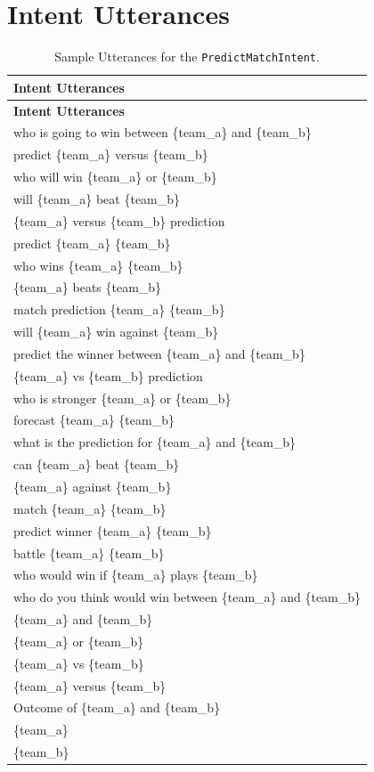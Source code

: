 \chapter{Intent Utterances}
{
\renewcommand{\arraystretch}{1.3}
\begin{longtable}{@{} p{\linewidth} @{}}
\caption{Sample Utterances for the \texttt{PredictMatchIntent}.} \label{tab:utterances} \\
\toprule
\textbf{Intent Utterances} \\
\midrule
\endfirsthead

\toprule
\textbf{Intent Utterances} \\
\midrule
\endhead

\bottomrule
\endfoot

who is going to win between \{team\_a\} and \{team\_b\} \\
predict \{team\_a\} versus \{team\_b\} \\
who will win \{team\_a\} or \{team\_b\} \\
will \{team\_a\} beat \{team\_b\} \\
\{team\_a\} versus \{team\_b\} prediction \\
predict \{team\_a\} \{team\_b\} \\
who wins \{team\_a\} \{team\_b\} \\
\{team\_a\} beats \{team\_b\} \\
match prediction \{team\_a\} \{team\_b\} \\
will \{team\_a\} win against \{team\_b\} \\
predict the winner between \{team\_a\} and \{team\_b\} \\
\{team\_a\} vs \{team\_b\} prediction \\
who is stronger \{team\_a\} or \{team\_b\} \\
forecast \{team\_a\} \{team\_b\} \\
what is the prediction for \{team\_a\} and \{team\_b\} \\
can \{team\_a\} beat \{team\_b\} \\
\{team\_a\} against \{team\_b\} \\
match \{team\_a\} \{team\_b\} \\
predict winner \{team\_a\} \{team\_b\} \\
battle \{team\_a\} \{team\_b\} \\
who would win if \{team\_a\} plays \{team\_b\} \\
who do you think would win between \{team\_a\} and \{team\_b\} \\
\{team\_a\} and \{team\_b\} \\
\{team\_a\} or \{team\_b\} \\
\{team\_a\} vs \{team\_b\} \\
\{team\_a\} versus \{team\_b\} \\
Outcome of \{team\_a\} and \{team\_b\} \\
\{team\_a\} \\
\{team\_b\} \\
\end{longtable}
}